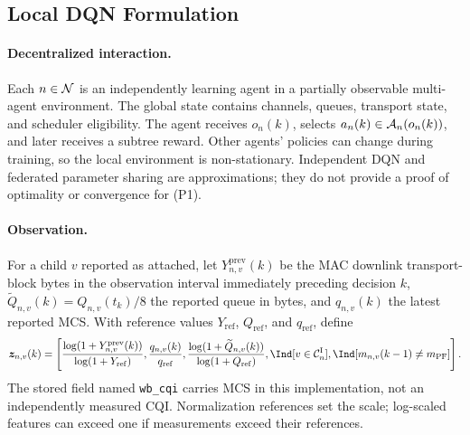 \begin{EnChapter}
\section{Local DQN Formulation}
\label{subsec:marl}

\paragraph{Decentralized interaction.}
Each $n\in\mathcal{N}$ is an independently learning agent in a partially observable
multi-agent environment. The global state contains channels, queues, transport
state, and scheduler eligibility. The agent receives $o_n(k)$, selects
$a_n(k)\in\mathcal{A}_n(o_n(k))$, and later receives a subtree reward. Other agents'
policies can change during training, so the local environment is non-stationary.
Independent DQN and federated parameter sharing are approximations; they do not
provide a proof of optimality or convergence for (P1).

\paragraph{Observation.}
For a child $v$ reported as attached, let $Y_{n,v}^{\mathrm{prev}}(k)$ be the MAC downlink
transport-block bytes in the observation interval immediately preceding decision
$k$, $\widetilde Q_{n,v}(k)=Q_{n,v}(t_k)/8$ the reported queue in bytes, and
$q_{n,v}(k)$ the latest reported MCS. With reference values $Y_{\mathrm{ref}}$,
$Q_{\mathrm{ref}}$, and $q_{\mathrm{ref}}$, define
\begin{equation}
  \bm z_{n,v}(k)=\left[
  \frac{\log(1+Y_{n,v}^{\mathrm{prev}}(k))}{\log(1+Y_{\mathrm{ref}})},
  \frac{q_{n,v}(k)}{q_{\mathrm{ref}}},
  \frac{\log(1+\widetilde Q_{n,v}(k))}{\log(1+Q_{\mathrm{ref}})},
  \Ind[v\in\Cset_n^{\mathrm{I}}],
  \Ind[m_{n,v}(k-1)\ne m_{\mathrm{PF}}]\right].
  \label{eq:child-feature}
\end{equation}
The stored field named \texttt{wb\_cqi} carries MCS in this implementation, not
an independently measured CQI. Normalization references set the scale; log-scaled
features can exceed one if measurements exceed their references.


\end{EnChapter}
